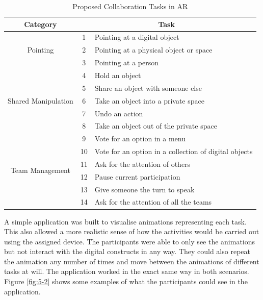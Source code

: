 \begin{table}[]
\caption{Proposed Collaboration Tasks in \ac{AR}}
\begin{tabularx}{\textwidth}{@{}ccX@{}}
\textbf{Category}                    & \multicolumn{2}{c}{\textbf{Task}}                          \\ \midrule
\multirow{3}{*}{Pointing}            & 1  & Pointing at a digital object                          \\ 
                                     & 2  & Pointing at a physical object or space                \\ 
                                     & 3  & Pointing at a person                                  \\ \midrule
\multirow{5}{*}{Shared Manipulation} & 4  & Hold an object                                        \\ 
                                     & 5  & Share an object with someone else                     \\ 
                                     & 6  & Take an object into a private space                   \\ 
                                     & 7  & Undo an action                                        \\ 
                                     & 8  & Take an object out of the private space               \\ \midrule
\multirow{6}{*}{Team Management}     & 9  & Vote for an option in a menu                          \\ 
                                     & 10 & Vote for an option in a collection of digital objects \\ 
                                     & 11 & Ask for the attention of others                       \\ 
                                     & 12 & Pause current participation                           \\ 
                                     & 13 & Give someone the turn to speak                        \\ 
                                     & 14 & Ask for the attention of all the teams                \\ \bottomrule
\end{tabularx}
\label{tab:5-1}
\end{table}

A simple application was built to visualise animations representing each task. This also allowed a more realistic sense of how the activities would be carried out using the assigned device.
The participants were able to only see the animations but not interact with the digital constructs in any way. They could also repeat the animation any number of times and move between the
animations of different tasks at will. The application worked in the exact same way in both scenarios. Figure \ref{fig:5-2} shows some examples of what the participants could see in the
application.

